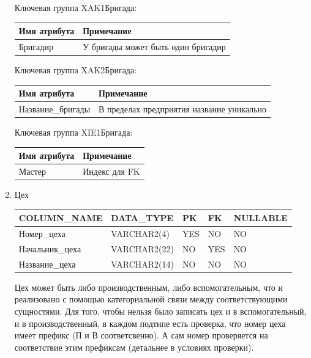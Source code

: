 \begin{enumerate}
\begin{tabular}{|p{7cm}|p{3cm}|p{1cm}|p{1cm}|p{3cm}|}
    \end{tabular}

    Ключевая группа XAK1Бригада:

    \begin{tabular}{|p{7cm}|p{9.3cm}|} \hline

        {\bf Имя атрибута} & {\bf Примечание} \\ \hline
        Бригадир & У бригады может быть один бригадир\\ \hline

    \end{tabular}

    Ключевая группа XAK2Бригада:

    \begin{tabular}{|p{7cm}|p{9.3cm}|} \hline

        {\bf Имя атрибута} & {\bf Примечание} \\ \hline
        Название\_бригады & В пределах предприятия название уникально \\ \hline

    \end{tabular}

    Ключевая группа XIE1Бригада:

    \begin{tabular}{|p{7cm}|p{9.3cm}|} \hline

        {\bf Имя атрибута} & {\bf Примечание} \\ \hline
        Мастер & Индекс для FK \\ \hline

    \end{tabular}

    \item{Цех}

    \begin{tabular}{|p{7cm}|p{3cm}|p{1cm}|p{1cm}|p{3cm}|} \hline

        {\bf COLUMN\_NAME} & {\bf DATA\_TYPE} & {\bf PK} & {\bf FK} & {\bf NULLABLE} \\ \hline
        Номер\_цеха & VARCHAR2(4) & YES & NO & NO \\ \hline
        Начальник\_цеха & VARCHAR2(22) & NO & YES & NO \\ \hline
        Название\_цеха & VARCHAR2(14) & NO & NO & NO \\ \hline

    \end{tabular}

    Цех может быть либо производственным, либо вспомогательным, что и реализовано с помощью категориальной связи между соответствующими сущностями.
    Для того, чтобы нельзя было записать цех и в вспомогательный, и в производственный, в каждом подтипе есть проверка, что номер цеха имеет префикс (П и В соответсвенно).
    А сам номер проверяется на соответствие этим префиксам (детальнее в условиях проверки).


\end{enumerate}
